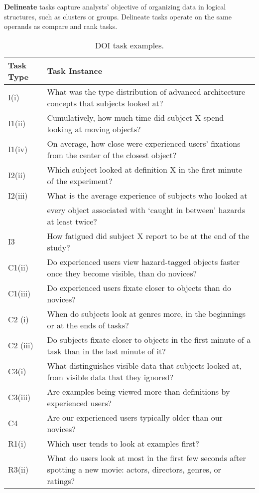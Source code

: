 \vspace{2mm}
\noindent\textbf{Delineate} tasks capture analysts' objective of organizing data in logical structures, such as clusters or groups. Delineate tasks operate on the same operands as compare and rank tasks. 

\begin{sidewaystable}
\caption{DOI task examples.}
	\centering
    \begin{tabular}{|l|l|}
    \hline
    Task Type & Task Instance \\
    \hline
        I(i)& What was the type distribution of advanced architecture concepts that subjects looked at?\\
    I1(ii) &Cumulatively, how much time did subject X spend looking at moving objects?\\
    I1(iv) &On average, how close were experienced users’ fixations from the center of the closest object?\\
    I2(ii) &Which subject looked at definition X in the first minute of the experiment?\\
    I2(iii) & What is the average experience of subjects who looked at\\& every object associated with `caught in between' hazards at least twice?\\
    I3 & How fatigued did subject X report to be at the end of the study?\\
    \hline
    C1(ii) & Do experienced users view hazard-tagged objects faster once they become visible, than do novices?\\
C1(iii) & Do experienced users fixate closer to objects than do novices?\\
C2 (i) & When do subjects look at genres more, in the beginnings or at the ends of tasks?\\
C2 (iii) & Do subjects fixate closer to objects in the first minute of a task than in the last minute of it?\\
C3(i)& What distinguishes visible data that subjects looked at, from visible data that they ignored?\\
C3(iii)& Are examples being viewed more than definitions by experienced users?\\
C4 & Are our experienced users typically older than our novices?\\
    \hline
R1(i) & Which user tends to look at examples first?\\
R3(ii) & What do users look at most in the first few seconds after spotting a new movie: actors, directors, genres, or ratings?\\

\end{tabular}
\end{sidewaystable}
